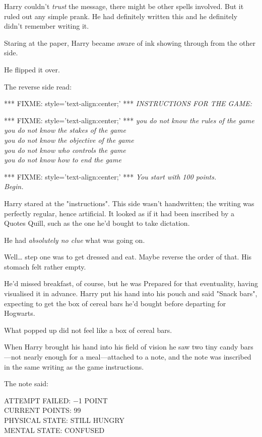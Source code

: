 Harry couldn't \emph{trust} the message, there might be other spells involved. 
But it ruled out any simple prank. He had definitely written this and he 
definitely didn't remember writing it.

Staring at the paper, Harry became aware of ink showing through from the other 
side.

He flipped it over.

The reverse side read:

*** FIXME: style='text-align:center;' ***
\emph{INSTRUCTIONS FOR THE GAME:}

*** FIXME: style='text-align:center;' ***
\emph{you do not know the rules of the game\\
you do not know the stakes of the game\\
you do not know the objective of the game\\
you do not know who controls the game\\
you do not know how to end the game}

*** FIXME: style='text-align:center;' ***
\emph{You start with 100 points.\\
Begin.}

Harry stared at the "instructions". This side wasn't handwritten; the writing 
was perfectly regular, hence artificial. It looked as if it had been inscribed 
by a Quotes Quill, such as the one he'd bought to take dictation.

He had \emph{absolutely no clue} what was going on.

Well{\ldots} step one was to get dressed and eat. Maybe reverse the order of 
that. His stomach felt rather empty.

He'd missed breakfast, of course, but he was Prepared for that eventuality, 
having visualised it in advance. Harry put his hand into his pouch and said 
"Snack bars", expecting to get the box of cereal bars he'd bought before 
departing for Hogwarts.

What popped up did not feel like a box of cereal bars.

When Harry brought his hand into his field of vision he saw two tiny candy 
bars---not nearly enough for a meal---attached to a note, and the note was 
inscribed in the same writing as the game instructions.

The note said:

ATTEMPT FAILED: $-$1 POINT\\
CURRENT POINTS: 99\\
PHYSICAL STATE: STILL HUNGRY\\
MENTAL STATE: CONFUSED

